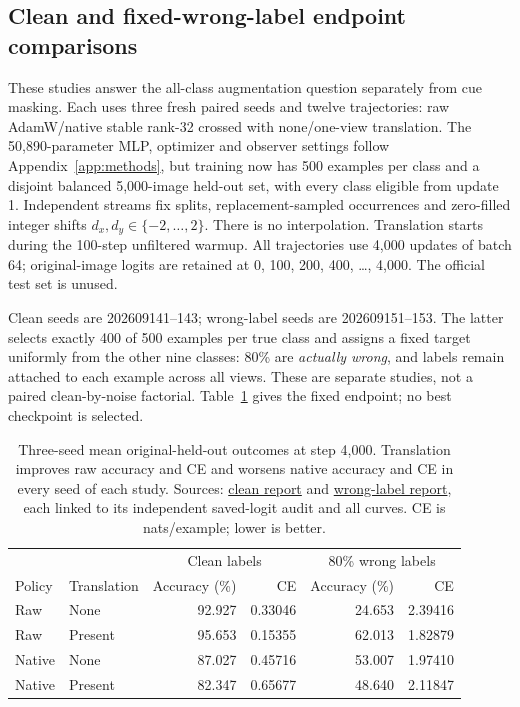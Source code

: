 \documentclass[10pt]{article}
\newcommand{\src}[2]{\href{../../../#1}{#2}}
\begin{document}
\subsection{Clean and fixed-wrong-label endpoint comparisons}
These studies answer the all-class augmentation question separately from cue masking. Each uses three fresh paired seeds and twelve trajectories: raw AdamW/native stable rank-32 crossed with none/one-view translation. The 50,890-parameter MLP, optimizer and observer settings follow Appendix~\ref{app:methods}, but training now has 500 examples per class and a disjoint balanced 5,000-image held-out set, with every class eligible from update 1. Independent streams fix splits, replacement-sampled occurrences and zero-filled integer shifts $d_x,d_y\in\{-2,\ldots,2\}$. There is no interpolation. Translation starts during the 100-step unfiltered warmup. All trajectories use 4,000 updates of batch 64; original-image logits are retained at 0, 100, 200, 400, \ldots, 4,000. The official test set is unused.

Clean seeds are 202609141--143; wrong-label seeds are 202609151--153. The latter selects exactly 400 of 500 examples per true class and assigns a fixed target uniformly from the other nine classes: 80\% are \emph{actually wrong}, and labels remain attached to each example across all views. These are separate studies, not a paired clean-by-noise factorial. Table~\ref{tab:ordinary-augmentation} gives the fixed endpoint; no best checkpoint is selected.

\begin{table}[htbp]
\centering\small
\begin{tabular}{llrrrr}
\toprule
& & \multicolumn{2}{c}{Clean labels} & \multicolumn{2}{c}{80\% wrong labels}\\
Policy & Translation & Accuracy (\%) & CE & Accuracy (\%) & CE\\\midrule
Raw & None & 92.927 & 0.33046 & 24.653 & 2.39416\\
Raw & Present & 95.653 & 0.15355 & 62.013 & 1.82879\\
Native & None & 87.027 & 0.45716 & 53.007 & 1.97410\\
Native & Present & 82.347 & 0.65677 & 48.640 & 2.11847\\\bottomrule
\end{tabular}
\caption{Three-seed mean original-held-out outcomes at step 4,000. Translation improves raw accuracy and CE and worsens native accuracy and CE in every seed of each study. Sources: \src{output/2026-09-10-spectral-general-augmentation/results.md}{clean report} and \src{output/2026-09-10-spectral-wrong-label-augmentation/results.md}{wrong-label report}, each linked to its independent saved-logit audit and all curves. CE is nats/example; lower is better.}
\label{tab:ordinary-augmentation}
\end{table}
\end{document}
